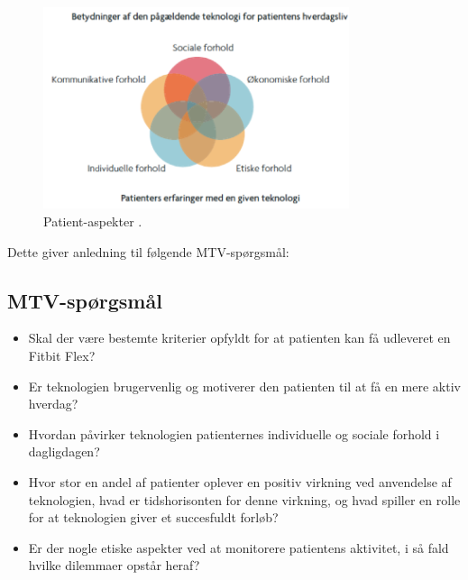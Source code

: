\begin{figure}[H]
\centering
\includegraphics[width=0.8\textwidth]{figures/patientaspekter}
\caption{Patient-aspekter \citep{mtvhaandbog}.}
\label{fig:patientaspekter}
\end{figure}

\noindent
Dette giver anledning til følgende MTV-spørgsmål: 

\subsection{MTV-spørgsmål}
\begin{itemize}
\item Skal der være bestemte kriterier opfyldt for at patienten kan få udleveret en Fitbit Flex?
\item Er teknologien brugervenlig og motiverer den patienten til at få en mere aktiv hverdag?
\item Hvordan påvirker teknologien patienternes individuelle og sociale forhold i dagligdagen?
\item Hvor stor en andel af patienter oplever en positiv virkning ved anvendelse af teknologien, hvad er tidshorisonten for denne virkning, og hvad spiller en rolle for at teknologien giver et succesfuldt forløb?
\item Er der nogle etiske aspekter ved at monitorere patientens aktivitet, i så fald hvilke dilemmaer opstår heraf?
\end{itemize} 


